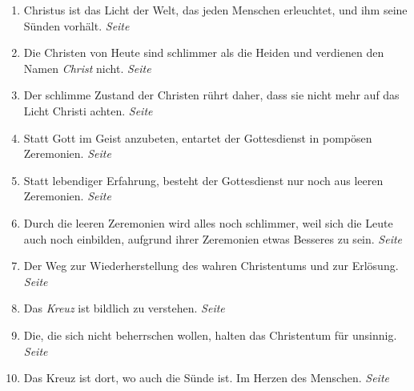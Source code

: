 \begin{enumerate}
 \item Christus ist das Licht der Welt, das jeden Menschen erleuchtet, und ihm
seine Sünden vorhält.
 \dotfill \textit{Seite~\pageref{ref:02_03_gott_in_jedem}}\\

 \item Die Christen von Heute sind schlimmer als die Heiden und verdienen den
Namen \textit{Christ} nicht.
 \dotfill \textit{Seite
\pageref{ref:02_08_schlimmer_als_heiden}}\\

 \item Der schlimme Zustand der Christen rührt daher, dass sie nicht mehr auf das
Licht Christi achten.
 \dotfill \textit{Seite
\pageref{ref:02_08_ursache_des_abfalls}}\\
 \item Statt Gott im Geist anzubeten, entartet der Gottesdienst in pompösen
Zeremonien.
 \dotfill \textit{Seite~\pageref{ref:02_08_falscher_gottesdienst}}\\

 \item Statt lebendiger Erfahrung, besteht der Gottesdienst nur noch aus leeren
Zeremonien. \dotfill \textit{Seite~\pageref{ref:02_09_lebendige_erfahrung}}\\

 \item Durch die leeren Zeremonien wird alles noch schlimmer, weil sich die
Leute auch noch einbilden, aufgrund ihrer Zeremonien etwas Besseres zu sein.
 \dotfill \textit{Seite
\pageref{ref:02_09_selbstueberschaetzung}}\\

 \item Der Weg zur Wiederherstellung des wahren Christentums und zur Erlösung.
 \dotfill \textit{Seite~\pageref{ref:02_10_abhilfe}}\\

 \item Das \textit{Kreuz} ist bildlich zu verstehen.
 \dotfill \textit{Seite~\pageref{ref:03_01_das_kreuz}}\\

 \item Die, die sich nicht beherrschen wollen, halten das Christentum für
unsinnig.
 \dotfill \textit{Seite~\pageref{ref:03_02_leidenschaft}}\\

 \item Das Kreuz ist dort, wo auch die Sünde ist. Im Herzen des Menschen.
 \dotfill \textit{Seite~\pageref{ref:03_03_ort_des_kreuzes}}\\


\end{enumerate}

